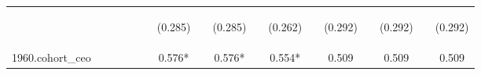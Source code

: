 \begin{center}
\begin{tabular}{lcccccccccccccccc}
\vspace{4pt} & \begin{footnotesize}\end{footnotesize} & \begin{footnotesize}\end{footnotesize} & \begin{footnotesize}\end{footnotesize} & \begin{footnotesize}\end{footnotesize} & \begin{footnotesize}\end{footnotesize} & \begin{footnotesize}(0.285)\end{footnotesize} & \begin{footnotesize}\end{footnotesize} & \begin{footnotesize}(0.285)\end{footnotesize} & \begin{footnotesize}\end{footnotesize} & \begin{footnotesize}(0.262)\end{footnotesize} & \begin{footnotesize}\end{footnotesize} & \begin{footnotesize}(0.292)\end{footnotesize} & \begin{footnotesize}\end{footnotesize} & \begin{footnotesize}(0.292)\end{footnotesize} & \begin{footnotesize}\end{footnotesize} & \begin{footnotesize}(0.292)\end{footnotesize} \\
1960.cohort\_ceo &  &  &  &  &  & 0.576* &  & 0.576* &  & 0.554* &  & 0.509 &  & 0.509 &  & 0.509 \\

\end{tabular}
\end{center}
